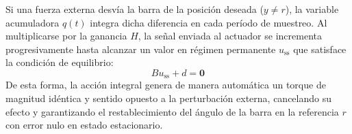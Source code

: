 \documentclass[11pt,a4paper]{article}
\begin{document}
Si una fuerza externa desvía la barra de la posición deseada ($y \neq r$), la variable acumuladora $q(t)$ integra dicha diferencia en cada período de muestreo. Al multiplicarse por la ganancia $H$, la señal enviada al actuador se incrementa progresivamente hasta alcanzar un valor en régimen permanente $u_{\text{ss}}$ que satisface la condición de equilibrio:
\begin{equation}
B u_{\text{ss}} + d = \mathbf{0}
\end{equation}
De esta forma, la acción integral genera de manera automática un torque de magnitud idéntica y sentido opuesto a la perturbación externa, cancelando su efecto y garantizando el restablecimiento del ángulo de la barra en la referencia $r$ con error nulo en estado estacionario.
\end{document}
